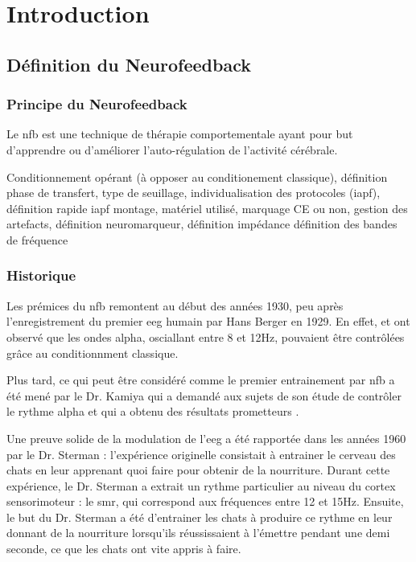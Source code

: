 \chapter{Introduction} \label{chapitre-1}


\section{Définition du Neurofeedback}

\subsection{Principe du Neurofeedback}

Le \gls{nfb} est une technique de thérapie comportementale ayant pour but d'apprendre ou d'améliorer l'auto-régulation de l'activité cérébrale.

Conditionnement opérant (à opposer au conditionement classique), définition phase de transfert, type de seuillage, individualisation des protocoles (iapf), 
définition rapide iapf
montage, matériel utilisé, marquage CE ou non, gestion des artefacts, définition neuromarqueur, définition impédance
définition des bandes de fréquence


\subsection{Historique}

Les prémices du \gls{nfb} remontent au début des années 1930, peu après l'enregistrement du premier \gls{eeg} humain par Hans Berger en 1929.
En effet, \citet{Durup1935} et \citet{Loomis1936} ont observé que les ondes alpha, osciallant entre 8 et 12Hz, 
pouvaient être contrôlées grâce au conditionnment classique. 

Plus tard, ce qui peut être considéré comme le premier entrainement par \gls{nfb} a été mené par le Dr. Kamiya qui a demandé aux sujets de son étude de contrôler le rythme 
alpha et qui a obtenu des résultats prometteurs \citep{Kamiya1969}. 

Une preuve solide de la modulation de l'\gls{eeg} a été rapportée dans les années 1960 par le Dr. Sterman : l'expérience 
originelle consistait à entrainer le cerveau des chats en leur apprenant quoi faire pour obtenir de 
la nourriture. Durant cette expérience, le Dr. Sterman a extrait un rythme particulier au niveau du cortex sensorimoteur : le \gls{smr}, qui correspond aux fréquences 
entre 12 et 15Hz. Ensuite, le but du Dr. Sterman a été d'entrainer les chats à produire ce rythme en leur donnant de la nourriture lorsqu'ils réussissaient
à l'émettre pendant une demi seconde, ce que les chats ont vite appris à faire. 

